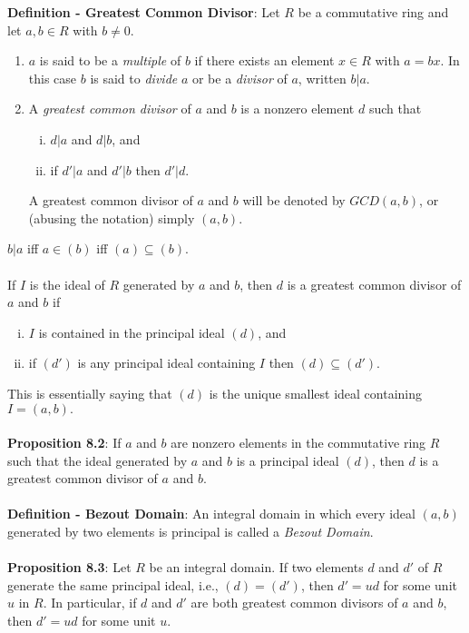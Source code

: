 \documentclass{article}
\begin{document}
\textbf{Definition - Greatest Common Divisor}: Let $R$ be a commutative ring and let $a, b \in R$ with $b \neq 0$. \begin{enumerate}
    \item $a$ is said to be a \textit{multiple} of $b$ if there exists an element $x \in R$ with $a = bx$. In this case $b$ is said to \textit{divide} $a$ or be a \textit{divisor} of $a$, written $b | a$.
    \item A \textit{greatest common divisor} of $a$ and $b$ is a nonzero element $d$ such that \begin{enumerate}[(i).]
        \item $d | a$ and $d | b$, and
        \item if $d' | a$ and $d' | b$ then $d' | d$.
    \end{enumerate}
    A greatest common divisor of $a$ and $b$ will be denoted by $GCD(a, b)$, or (abusing the notation) simply $(a, b)$. 
\end{enumerate} $ $ \\
$b|a$ iff $a \in (b)$ iff $(a) \subseteq (b)$. \\ \\
If $I$ is the ideal of $R$ generated by $a$ and $b$, then $d$ is a greatest common divisor of $a$ and $b$ if \begin{enumerate}[(i).]
    \item $I$ is contained in the principal ideal $(d)$, and
    \item if $(d')$ is any principal ideal containing $I$ then $(d) \subseteq (d')$. 
\end{enumerate} This is essentially saying that $(d)$ is the unique smallest ideal containing $I = (a, b).$ \\ \\
\textbf{Proposition 8.2}: If $a$ and $b$ are nonzero elements in the commutative ring $R$ such that the ideal generated by $a$ and $b$ is a principal ideal $(d)$, then $d$ is a greatest common divisor of $a$ and $b$. \\ \\
\textbf{Definition - Bezout Domain}: An integral domain in which every ideal $(a, b)$ generated by two elements is principal is called a \textit{Bezout Domain}. \\ \\
\textbf{Proposition 8.3}: Let $R$ be an integral domain. If two elements $d$ and $d'$ of $R$ generate the same principal ideal, i.e., $(d) = (d')$, then $d' = ud$ for some unit $u$ in $R$. In particular, if $d$ and $d'$ are both greatest common divisors of $a$ and $b$, then $d' = ud$ for some unit $u$. \\ \\
\end{document}
